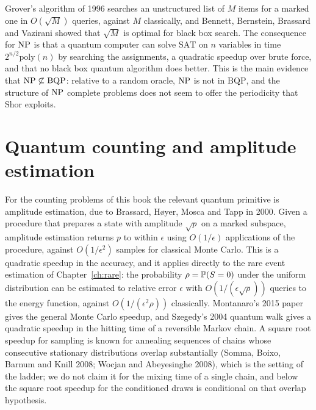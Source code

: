 Grover's algorithm of 1996 searches an unstructured list of $M$ items for a marked one in $O(\sqrt M)$ queries, against $M$ classically, and Bennett, Bernstein, Brassard and Vazirani showed that $\sqrt M$ is optimal for black box search. The consequence for $\mathrm{NP}$ is that a quantum computer can solve $\mathrm{SAT}$ on $n$ variables in time $2^{n/2} \mathrm{poly}(n)$ by searching the assignments, a quadratic speedup over brute force, and that no black box quantum algorithm does better. This is the main evidence that $\mathrm{NP} \not\subseteq \mathrm{BQP}$: relative to a random oracle, $\mathrm{NP}$ is not in $\mathrm{BQP}$, and the structure of $\mathrm{NP}$ complete problems does not seem to offer the periodicity that Shor exploits.

\section{Quantum counting and amplitude estimation}

For the counting problems of this book the relevant quantum primitive is amplitude estimation, due to Brassard, H{\o}yer, Mosca and Tapp in 2000. Given a procedure that prepares a state with amplitude $\sqrt{p}$ on a marked subspace, amplitude estimation returns $p$ to within $\epsilon$ using $O(1/\epsilon)$ applications of the procedure, against $O(1/\epsilon^2)$ samples for classical Monte Carlo. This is a quadratic speedup in the accuracy, and it applies directly to the rare event estimation of Chapter~\ref{ch:rare}: the probability $\rho = \mathbb{P}(S = 0)$ under the uniform distribution can be estimated to relative error $\epsilon$ with $O(1 / (\epsilon \sqrt\rho))$ queries to the energy function, against $O(1 / (\epsilon^2 \rho))$ classically. Montanaro's 2015 paper gives the general Monte Carlo speedup, and Szegedy's 2004 quantum walk gives a quadratic speedup in the hitting time of a reversible Markov chain. A square root speedup for sampling is known for annealing sequences of chains whose consecutive stationary distributions overlap substantially (Somma, Boixo, Barnum and Knill 2008; Wocjan and Abeyesinghe 2008), which is the setting of the ladder; we do not claim it for the mixing time of a single chain, and below the square root speedup for the conditioned draws is conditional on that overlap hypothesis.

